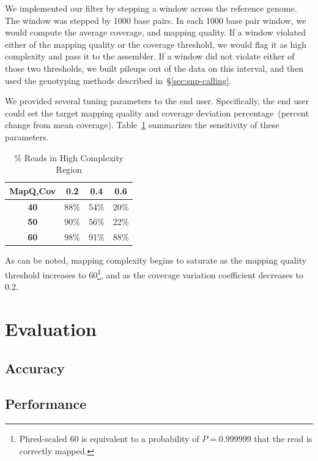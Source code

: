 \documentclass{acm_proc_article-sp}
\begin{document}
We implemented our filter by stepping a window across the reference genome. The window was stepped by 1000 base pairs. In each
1000 base pair window, we would compute the average coverage, and mapping quality. If a window violated either of the mapping
quality or the coverage threshold, we would flag it as high complexity and pass it to the assembler. If a window did not violate either
of those two thresholds, we built pileups out of the data on this interval, and then used the genotyping methods described
in~\S\ref{sec:snp-calling}.

We provided several tuning parameters to the end user. Specifically, the end user could set the target mapping quality and coverage
deviation percentage~(percent change from mean coverage). Table~\ref{tab:filter} summarizes the sensitivity of these parameters.

\begin{table}[h]
\caption{\% Reads in High Complexity Region}
\begin{center}
\begin{tabular}{| c || c | c | c |}
\hline
\bf MapQ,Cov & \bf 0.2 & \bf 0.4 & \bf 0.6 \\
\hline
\hline
\bf 40 & 88\% & 54\% & 20\% \\
\bf 50 & 90\% & 56\% & 22\% \\
\bf 60 & 98\% & 91\% & 88\% \\
\hline 
\end{tabular}
\end{center}
\label{tab:filter}
\end{table}

As can be noted, mapping complexity begins to saturate as the mapping quality threshold increases to 60\footnote{Phred-scaled 60 is
equivalent to a probability of $P=0.999999$ that the read is correctly mapped.}, and as the coverage variation coefficient decreases to 0.2.

\section{Evaluation}
\label{sec:evaluation}


\subsection{Accuracy}
\label{sec:accuracy}


\subsection{Performance}
\label{sec:performance}
\end{document}
